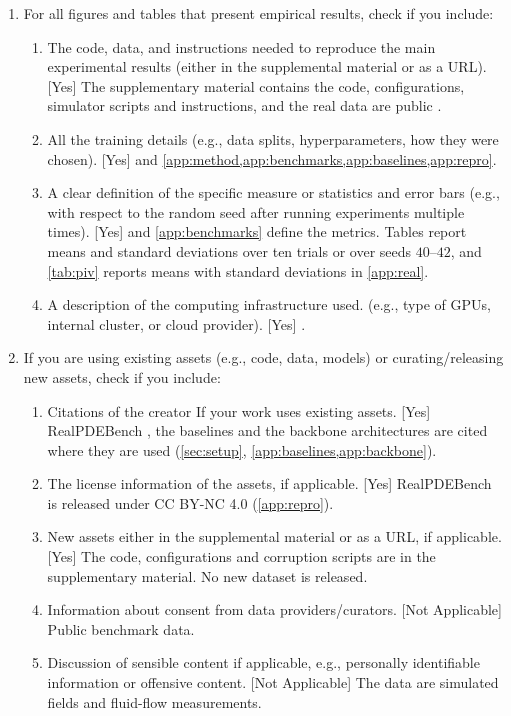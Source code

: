 \documentclass[twoside]{article}
\begin{document}
\begin{enumerate}
  \item For all figures and tables that present empirical results, check if you
  include:
  \begin{enumerate}
    \item The code, data, and instructions needed to reproduce the main
    experimental results (either in the supplemental material or as a URL).
    [Yes] The supplementary material contains the code, configurations,
    simulator scripts and instructions, and the real data are public
    \citep{hu2026realpdebench}.
    \item All the training details (e.g., data splits, hyperparameters, how they
    were chosen). [Yes]  and \cref{app:method,app:benchmarks,app:baselines,app:repro}.
    \item A clear definition of the specific measure or statistics and error
    bars (e.g., with respect to the random seed after running experiments
    multiple times). [Yes]  and \cref{app:benchmarks} define the
    metrics. Tables report means and standard deviations over ten trials or
    over seeds $40$--$42$, and \cref{tab:piv} reports means with standard
    deviations in \cref{app:real}.
    \item A description of the computing infrastructure used. (e.g., type of
    GPUs, internal cluster, or cloud provider). [Yes] .
  \end{enumerate}

  \item If you are using existing assets (e.g., code, data, models) or
  curating/releasing new assets, check if you include:
  \begin{enumerate}
    \item Citations of the creator If your work uses existing assets. [Yes]
    RealPDEBench \citep{hu2026realpdebench}, the baselines and the backbone
    architectures are cited where they are used (\cref{sec:setup},
    \cref{app:baselines,app:backbone}).
    \item The license information of the assets, if applicable. [Yes]
    RealPDEBench is released under CC BY-NC 4.0 (\cref{app:repro}).
    \item New assets either in the supplemental material or as a URL, if
    applicable. [Yes] The code, configurations and corruption scripts are in
    the supplementary material. No new dataset is released.
    \item Information about consent from data providers/curators. [Not
    Applicable] Public benchmark data.
    \item Discussion of sensible content if applicable, e.g., personally
    identifiable information or offensive content. [Not Applicable] The data
    are simulated fields and fluid-flow measurements.
  \end{enumerate}


\end{enumerate}
\end{document}
